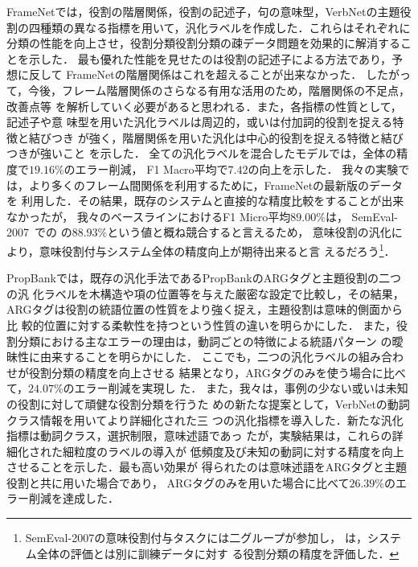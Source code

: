 \documentclass[japanese]{jnlp_1.4}
\begin{document}
FrameNetでは，役割の階層関係，役割の記述子，句の意味型，VerbNetの主題役
割の四種類の異なる指標を用いて，汎化ラベルを作成した．これらはそれぞれに
分類の性能を向上させ，役割分類役割分類の疎データ問題を効果的に解消することを示した．
最も優れた性能を見せたのは役割の記述子による方法であり，予想に反して
FrameNetの階層関係はこれを超えることが出来なかった．
したがって，今後，フレーム階層関係のさらなる有用な活用のため，階層関係の不足点，改善点等
を解析していく必要があると思われる．また，各指標の性質として，記述子や意
味型を用いた汎化ラベルは周辺的，或いは付加詞的役割を捉える特徴と結びつき
が強く，階層関係を用いた汎化は中心的役割を捉える特徴と結びつきが強いこと
を示した．
全ての汎化ラベルを混合したモデルでは，全体の精度で$19.16\%$のエラー削減，
F1 Macro平均で$7.42$の向上を示した．
我々の実験では，より多くのフレーム間関係を利用するために，FrameNetの最新版のデータを
利用した．その結果，既存のシステムと直接的な精度比較をすることが出来なかったが，
我々のベースラインにおけるF1 Micro平均$89.00\%$は，
SemEval-2007~\cite{baker-ellsworth-erk:2007:SemEval-2007}での
の$88.93\%$という値と概ね競合すると言えるため，
意味役割の汎化により，意味役割付与システム全体の精度向上が期待出来ると言
えるだろう\footnote{SemEval-2007の意味役割付与タスクには二グループが参加し，
は，システム全体の評価とは別に訓練データに対す
る役割分類の精度を評価した．}．

PropBankでは，既存の汎化手法であるPropBankのARGタグと主題役割の二つの汎
化ラベルを木構造や項の位置等を与えた厳密な設定で比較し，その結果，
ARGタグは役割の統語位置の性質をより強く捉え，主題役割は意味的側面から比
較的位置に対する柔軟性を持つという性質の違いを明らかにした．
また，役割分類における主なエラーの理由は，動詞ごとの特徴による統語パターン
の曖昧性に由来することを明らかにした．
ここでも，二つの汎化ラベルの組み合わせが役割分類の精度を向上させる
結果となり，ARGタグのみを使う場合に比べて，$24.07\%$のエラー削減を実現し
た．
また，我々は，事例の少ない或いは未知の役割に対して頑健な役割分類を行うた
めの新たな提案として，VerbNetの動詞クラス情報を用いてより詳細化された三
つの汎化指標を導入した．新たな汎化指標は動詞クラス，選択制限，意味述語であっ
たが，実験結果は，これらの詳細化された細粒度のラベルの導入が
低頻度及び未知の動詞に対する精度を向上させることを示した．最も高い効果が
得られたのは意味述語をARGタグと主題役割と共に用いた場合であり，
ARGタグのみを用いた場合に比べて$26.39\%$のエラー削減を達成した．
\end{document}
